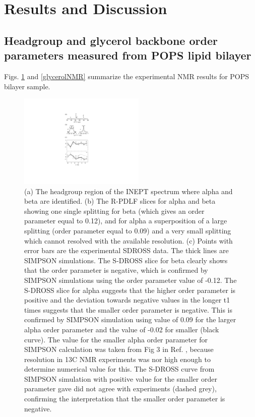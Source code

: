 \documentclass[aps,prl,superscriptaddress,twocolumn]{revtex4}
\begin{document}
\section{Results and Discussion}

\subsection{Headgroup and glycerol backbone order parameters measured from POPS lipid bilayer}

Figs. \ref{PShgSIGNSsimpson} and \ref{glycerolNMR} summarize the experimental NMR results for POPS
bilayer sample. 

\begin{figure}[!htb]
  \centering
  \includegraphics[width=6.0cm]{../Figs/PShgSIGNSsimpson.pdf}
  \caption{\label{PShgSIGNSsimpson}
    (a) The headgroup region of the INEPT spectrum where alpha and beta are
    identified.
    (b) The R-PDLF slices for alpha and beta showing one single
    splitting for beta (which gives an order parameter equal to 0.12), and for alpha a superposition
    of a large splitting (order parameter equal to 0.09) and a very small splitting which cannot
    resolved with the available resolution.
    (c) Points with error bars are the experimental SDROSS data.
    The thick lines are SIMPSON simulations.
    The S-DROSS slice for beta clearly shows that the order parameter is negative,
    which is confirmed by SIMPSON simulations using the order parameter value of -0.12.
    The S-DROSS slice for alpha suggests that the higher order parameter is positive
    and the deviation towards negative values in the longer t1 times suggests
    that the smaller order parameter is negative.
    This is confirmed by SIMPSON simulation using value of 0.09
    for the larger alpha order parameter and the value of -0.02 for
    smaller (black curve). The value for the smaller
    alpha order parameter for SIMPSON calculation was taken from Fig 3 in Ref. ,
    because resolution in 13C NMR experiments was nor high enough to determine
    numerical value for this. The S-DROSS curve from SIMPSON simulation with positive value
    for the smaller order parameter gave did not agree with experiments (dashed grey),
    confirming the interpretation that the smaller order parameter is negative.
  }
\end{figure}
\end{document}
